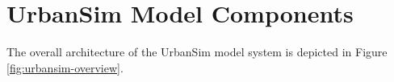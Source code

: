 



\section{UrbanSim Model Components}

The overall architecture of the UrbanSim model system is depicted in Figure \ref{fig:urbansim-overview}.  


